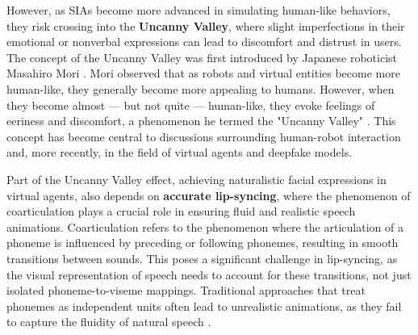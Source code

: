 \documentclass[12pt]{article}
\begin{document}


However, as SIAs become more advanced in simulating human-like behaviors, they risk crossing into the {\bf Uncanny Valley}, where slight imperfections in their emotional or nonverbal expressions can lead to discomfort and distrust in users. The concept of the Uncanny Valley was first introduced by Japanese roboticist Masahiro Mori \cite{mori1970uncanny}. Mori observed that as robots and virtual entities become more human-like, they generally become more appealing to humans. However, when they become almost — but not quite — human-like, they evoke feelings of eeriness and discomfort, a phenomenon he termed the "Uncanny Valley" \cite{mori1970uncanny}. This concept has become central to discussions surrounding human-robot interaction and, more recently, in the field of virtual agents and deepfake models.

Part of the Uncanny Valley effect, achieving naturalistic facial expressions in virtual agents, also depends on {\bf accurate lip-syncing}, where the phenomenon of coarticulation plays a crucial role in ensuring fluid and realistic speech animations. Coarticulation refers to the phenomenon where the articulation of a phoneme is influenced by preceding or following phonemes, resulting in smooth transitions between sounds. This poses a significant challenge in lip-syncing, as the visual representation of speech needs to account for these transitions, not just isolated phoneme-to-viseme mappings. Traditional approaches that treat phonemes as independent units often lead to unrealistic animations, as they fail to capture the fluidity of natural speech \cite{Edwards2016}.
\end{document}

